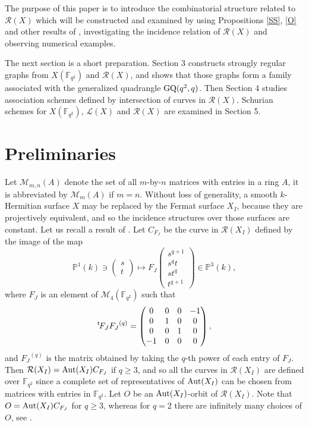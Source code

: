 \documentclass[11pt]{amsart}
\newcommand{\lt}{{}^\mathrm t\hspace{-0.5mm}}
\newcommand{\pmat}[1]{\begin{pmatrix} #1 \end{pmatrix}}
\theoremstyle{plain} %
\theoremstyle{definition} %
\theoremstyle{remark} %
\begin{document}
The purpose of this paper is to introduce the combinatorial structure related to $\mathcal{R}(X)$ which will be constructed and examined by
using Propositions \ref{SS}, \ref{O} and other results of \cite{O}, investigating
the incidence relation of $\mathcal{R}(X)$ and observing numerical examples.

The next section is a short preparation. Section 3 constructs strongly regular graphs from $X(\mathbb{F}_{q^2})$ and $\mathcal{R}(X)$, and shows that those graphs form a family associated with the generalized quadrangle ${\rm GQ}(q^2,q)$. Then Section 4 studies association schemes defined by intersection of curves in $\mathcal{R}(X)$. Schurian schemes for $X(\mathbb{F}_{q^2})$, $\mathcal{L}(X)$ and $\mathcal{R}(X)$ are examined in Section 5.

\section{Preliminaries}
Let $\mathcal{M}_{m,n}(A)$ denote the set of all $m$-by-$n$ matrices with entries in a ring $A$, it is abbreviated by $\mathcal{M}_{m}(A)$ if $m=n$.
Without loss of generality, a smooth $k$-Hermitian surface $X$ may be replaced by the Fermat surface $X_I$, because they are projectively equivalent, and so the incidence structures
over those surfaces are constant.
Let us recall a result of \cite{O}.
Let $C_{F_J}$ be the curve in $\mathcal{R}(X_I)$ defined by the image of the map
$$
\mathbb{P}^1(k)\ni\pmat{s\\t}\mapsto F_J\pmat{s^{q+1}\\s^qt\\st^q\\t^{q+1}}\in\mathbb{P}^3(k),
$$
where $F_J$ is an element of $\mathcal{M}_4(\mathbb{F}_{q^2})$
such that
\begin{equation*}
\lt {F_J}{F_J}^{(q)}=\pmat{0&0&0&-1\\0&1&0&0\\0&0&1&0\\-1&0&0&0},
\end{equation*}
and ${F_J}^{(q)}$ is the matrix obtained by taking the $q$-th power of each entry of $F_J$.
Then $\mathcal{R}(X_I)={\rm Aut}(X_I)C_{F_J}$ if $q\ge3$, and so all the curves in $\mathcal{R}(X_I)$ are defined over $\mathbb{F}_{q^2}$ since a complete set of representatives of ${\rm Aut}(X_I)$ can
be chosen from matrices with entries in $\mathbb{F}_{q^2}$. Let $O$ be an ${\rm Aut}(X_I)$-orbit of $\mathcal{R}(X_I)$. Note that $O={\rm Aut}(X_I)C_{F_J}$ for $q\ge3$, whereas for $q=2$ there are infinitely many choices of $O$, see \cite{O2}. 
\end{document}
